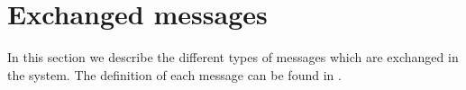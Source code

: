 \chapter{Exchanged messages}\label{ch:msgs}

In this section we describe the different types of messages which are exchanged
in the system. The definition of each message can be found in
.




